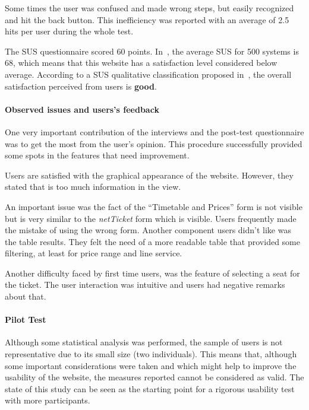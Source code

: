 \documentclass[a4paper]{article}
\begin{document}
Some times the user was confused and made wrong steps, but easily recognized and hit the back button. This inefficiency was reported with an average of 2.5 hits per user during the whole test.

The SUS questionnaire scored 60 points. In~\citep{sauro2011measuring}, the average SUS for 500 systems is 68, which means that this website has a satisfaction level considered below average. According to a SUS qualitative classification proposed in~\citep{bangor2009determining}, the overall satisfaction perceived from users is \textbf{good}.

\paragraph{Observed issues and users's feedback}
One very important contribution of the interviews and the post-test questionnaire was to get the most from the user's opinion. This procedure successfully provided some spots in the features that need improvement. 

Users are satisfied with the graphical appearance of the website. However, they stated that is too much information in the view.

An important issue was the fact of the ``Timetable and Prices'' form is not visible but is very similar to the \emph{netTicket} form which is visible. Users frequently made the mistake of using the wrong form. Another component users didn't like was the table results. They felt the need of a more readable table that provided some filtering, at least for price range and line service.

Another difficulty faced by first time users, was the feature of selecting a seat for the ticket. The user interaction was intuitive and users had negative remarks about that.

\paragraph{Pilot Test}

Although some statistical analysis was performed, the sample of users is not representative due to its small size (two individuals). This means that, although some important considerations were taken and which might help to improve the usability of the website, the measures reported cannot be considered as valid. 
The state of this study can be seen as the starting point for a rigorous usability test with more participants.  
\end{document}
